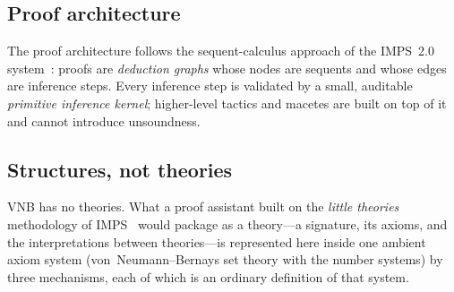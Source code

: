 \subsection{Proof architecture}

\begin{sloppypar}
The proof architecture follows the sequent-calculus approach of the
IMPS~2.0 system~\cite{IMPS}: proofs are \emph{deduction graphs} whose
nodes are sequents and whose edges are inference steps.  Every inference
step is validated by a small, auditable \emph{primitive inference kernel};
higher-level tactics and macetes are built on top of it and cannot
introduce unsoundness.
\end{sloppypar}

\subsection{Structures, not theories}
\label{sec:structures-not-theories}

VNB has no theories.  What a proof assistant built on the \emph{little
theories} methodology of IMPS~\cite{IMPS} would package as a theory---a
signature, its axioms, and the interpretations between theories---is
represented here inside one ambient axiom system (von~Neumann--Bernays set
theory with the number systems) by three mechanisms, each of which is an
ordinary definition of that system.

